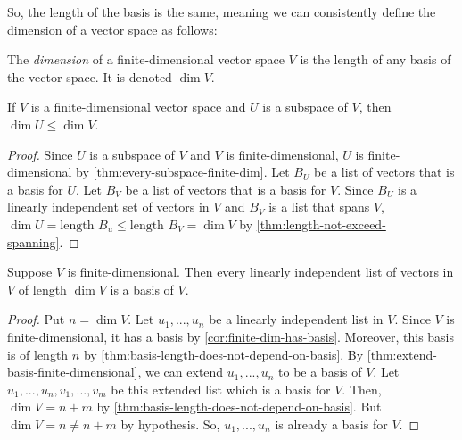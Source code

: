 \documentclass{article}
\begin{document}
So, the length of the basis is the same, meaning we can consistently
define the dimension of a vector space as follows:

\begin{definition}
  The \textit{dimension} of a finite-dimensional vector space $V$ is
  the length of any basis of the vector space. It is denoted $\dim V$.
\end{definition}

\begin{theorem}
  \label{thm:dim-of-subspace}
  If $V$ is a finite-dimensional vector space and $U$ is a subspace of
  $V$, then $\dim U \le \dim V$.
\end{theorem}
\begin{proof}
  Since $U$ is a subspace of $V$ and $V$ is finite-dimensional, $U$ is
  finite-dimensional by \cref{thm:every-subspace-finite-dim}. Let
  $B_U$ be a list of vectors that is a basis for $U$. Let $B_V$ be a
  list of vectors that is a basis for $V$. Since $B_U$ is a linearly
  independent set of vectors in $V$ and $B_V$ is a list that spans
  $V$, $\dim U = \text{length } B_u \le \text{length } B_V = \dim V$
  by \cref{thm:length-not-exceed-spanning}.
\end{proof}

\begin{theorem}
  \label{thm:linearly-independent-list-of-right-length-is-basis}
  Suppose $V$ is finite-dimensional. Then every linearly independent
  list of vectors in $V$ of length $\dim V$ is a basis of $V$.
\end{theorem}
\begin{proof}
  Put $n = \dim V$. Let $u_1, ..., u_n$ be a linearly independent list
  in $V$. Since $V$ is finite-dimensional, it has a basis by
  \cref{cor:finite-dim-has-basis}. Moreover, this basis is of
  length $n$ by \cref{thm:basis-length-does-not-depend-on-basis}. By
  \cref{thm:extend-basis-finite-dimensional}, we can extend $u_1,
  ..., u_n$ to be a basis of $V$. Let $u_1, ..., u_n, v_1, ..., v_m$
  be this extended list which is a basis for $V$. Then, $\dim V = n +
  m$ by \cref{thm:basis-length-does-not-depend-on-basis}. But $\dim
  V = n \ne n + m$ by hypothesis. So, $u_1, ..., u_n$ is already a
  basis for $V$.
\end{proof}
\end{document}
